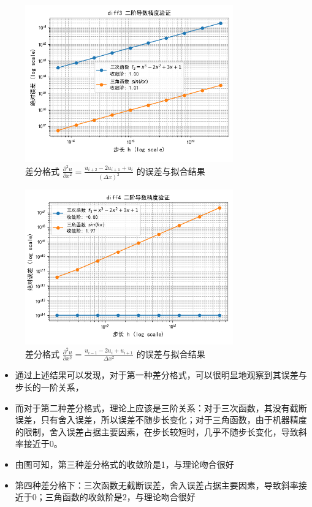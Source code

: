 \documentclass[UTF8]{ctexart}
\begin{document}
\begin{figure}[H]
    \centering
    \includegraphics[width=0.8\textwidth]{f3.png} 
    \caption{差分格式 $\frac{\partial^2 u}{\partial x^2} = \frac{u_{i+2} - 2u_{i+1} + u_i}{(\Delta x)^2}$  的误差与拟合结果}
    \label{fig:result3} 
\end{figure}
\begin{figure}[H]
    \centering
    \includegraphics[width=0.8\textwidth]{f4.png} 
    \caption{差分格式 $\frac{\partial^2 u}{\partial x^2} = \frac{u_{i-1} - 2u_i + u_{i+1}}{\Delta x^2}$  的误差与拟合结果}
    \label{fig:result4} 
\end{figure}

\begin{itemize}
    \item 通过上述结果可以发现，对于第一种差分格式，可以很明显地观察到其误差与步长的一阶关系，
    \item 而对于第二种差分格式，理论上应该是三阶关系：对于三次函数，其没有截断误差，只有舍入误差，所以误差不随步长变化；对于三角函数，由于机器精度的限制，舍入误差占据主要因素，在步长较短时，几乎不随步长变化，导致斜率接近于0。
    \item 由图可知，第三种差分格式的收敛阶是1，与理论吻合很好
    \item 第四种差分格下：三次函数无截断误差，舍入误差占据主要因素，导致斜率接近于0；三角函数的收敛阶是2，与理论吻合很好
\end{itemize}
\end{document}
